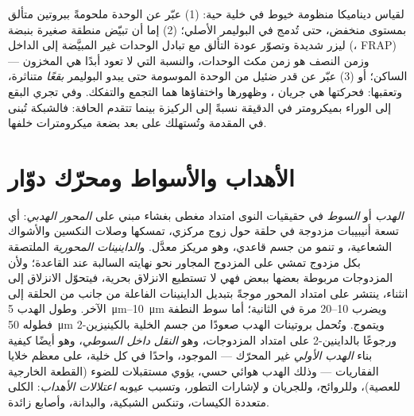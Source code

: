 \begin{method}\label{met:b3:cytoskeleton-motility:frap}
لقياس ديناميكا منظومة خيوط في خلية حية: (1)
عبّر عن الوحدة ملحومةً ببروتين متألق بمستوى منخفض، حتى
تُدمج في البوليمر الأصلي؛ (2) إما أن تبيّض
منطقة صغيرة بنبضة ليزر شديدة وتصوّر عودة
التألق مع تبادل الوحدات غير المبيَّضة إلى الداخل (\emph{}، FRAP) --- وزمن النصف هو
زمن مكث الوحدات، والنسبة التي لا تعود أبدًا هي
المخزون الساكن؛ أو (3) عبّر عن قدر ضئيل من الوحدة الموسومة حتى يبدو
البوليمر \emph{بقعًا} متناثرة، وتعقبها: فحركتها
هي جريان ، وظهورها واختفاؤها
هما التجمع والتفكك. وفي  تجري البقع
إلى الوراء بميكرومتر في الدقيقة نسبةً إلى الركيزة بينما تتقدم
الحافة: فالشبكة تُبنى في المقدمة وتُستهلك على بعد بضعة
ميكرومترات خلفها.
\end{method}

\section{الأهداب والأسواط ومحرّك دوّار}

\begin{definition}\label{def:b3:cytoskeleton-motility:cilia}
\emph{الهدب} أو \emph{السوط} في حقيقيات النوى امتداد مغطى
بغشاء مبني على \emph{المحور الهدبي}: أي تسعة أنيبيبات مزدوجة في
حلقة حول زوج مركزي، تمسكها وصلات النكسين والأشواك الشعاعية، و
تنمو من جسم قاعدي، وهو مريكز معدَّل. و\emph{الداينينات المحورية}
الملتصقة بكل مزدوج تمشي على المزدوج المجاور نحو نهايته
السالبة عند القاعدة؛ ولأن المزدوجات مربوطة بعضها ببعض فهي لا تستطيع
الانزلاق بحرية، فيتحوّل الانزلاق إلى انثناء، ينتشر
على امتداد المحور موجةً بتبديل الداينينات الفاعلة من جانب
من الحلقة إلى الآخر. وطول الهدب \qtyrange{5}{10}{\micro m}
ويضرب \numrange{10}{20} مرة في الثانية؛ أما سوط النطفة فطوله
\qty{50}{\micro m} ويتموج. وتُحمل بروتينات الهدب
صعودًا من جسم الخلية بالكينيزين-2 ورجوعًا بالداينين-2 على امتداد
المزدوجات، وهو \emph{النقل داخل السوطي}، وهو أيضًا كيفية بناء
\emph{الهدب الأولي} غير المحرّك --- الموجود، واحدًا في كل خلية، على معظم
خلايا الفقاريات --- وذلك الهدب هوائي حسي،
يؤوي مستقبلات للضوء (القطعة الخارجية للعصية)، وللروائح، وللجريان و
لإشارات التطور، وتسبب عيوبه \emph{اعتلالات الأهداب}:
الكلى متعددة الكيسات، وتنكس الشبكية، والبدانة، وأصابع زائدة.
\end{definition}


